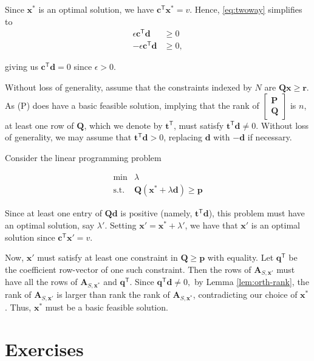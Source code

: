 \documentclass[]{book}
\def\gt{>}
\newcommand{\T}{\mathsf{T}}
\newcommand{\mm}[1]{\mathbf{#1}}
\renewcommand{\vec}[1]{\mathbf{#1}}
\theoremstyle{definition}
\theoremstyle{definition}
\theoremstyle{remark}
\begin{document}
Since \(\vec{x}^*\) is an optimal solution, we have
\(\vec{c}^\T\vec{x}^* = v\). Hence, \eqref{eq:twoway} simplifies to
\begin{align*}
\epsilon \vec{c}^\T \vec{d} & \geq 0 \\
-\epsilon \vec{c}^\T \vec{d} & \geq 0,
\end{align*}

giving us \(\vec{c}^\T\vec{d} = 0\) since \(\epsilon \gt 0\).

Without loss of generality, assume that the constraints indexed by \(N\)
are \(\mm{Q}\vec{x} \geq \vec{r}\). As (P) does have a basic feasible
solution, implying that the rank of
\(\begin{bmatrix} \mm{P} \\ \mm{Q}\end{bmatrix}\) is \(n\), at least one
row of \(\mm{Q}\), which we denote by \(\vec{t}^\T\), must satisfy
\(\vec{t}^\T\vec{d}\neq 0\). Without loss of generality, we may assume
that \(\vec{t}^\T\vec{d} \gt 0\), replacing \(\vec{d}\) with
\(-\vec{d}\) if necessary.

Consider the linear programming problem

\begin{equation*}
\begin{array}{rl}
 \min & \lambda \\
\text{s.t.} & \mm{Q}(\vec{x}^*+\lambda \vec{d}) \geq \vec{p}
\end{array}
\end{equation*}

Since at least one entry of \(\mm{Q}\vec{d}\) is positive (namely,
\(\vec{t}^\T\vec{d}\)), this problem must have an optimal solution, say
\(\lambda'\). Setting \(\vec{x}' = \vec{x}^* + \lambda'\), we have that
\(\vec{x}'\) is an optimal solution since \(\vec{c}^\T\vec{x}' = v\).

Now, \(\vec{x}'\) must satisfy at least one constraint in
\(\mm{Q} \geq \vec{p}\) with equality. Let \(\vec{q}^\T\) be the
coefficient row-vector of one such constraint. Then the rows of
\(\mm{A}_{S,\vec{x}'}\) must have all the rows of
\(\mm{A}_{S,\vec{x}^*}\) and \(\vec{q}^\T\). Since
\(\vec{q}^\T\vec{d} \neq 0,\) by Lemma \ref{lem:orth-rank}, the rank of
\(\mm{A}_{S,\vec{x}'}\) is larger than rank the rank of
\(\mm{A}_{S,\vec{x}^*}\), contradicting our choice of \(\vec{x}^*\).
Thus, \(\vec{x}^*\) must be a basic feasible solution.

\section*{Exercises}\label{exercises-8}
\end{document}
